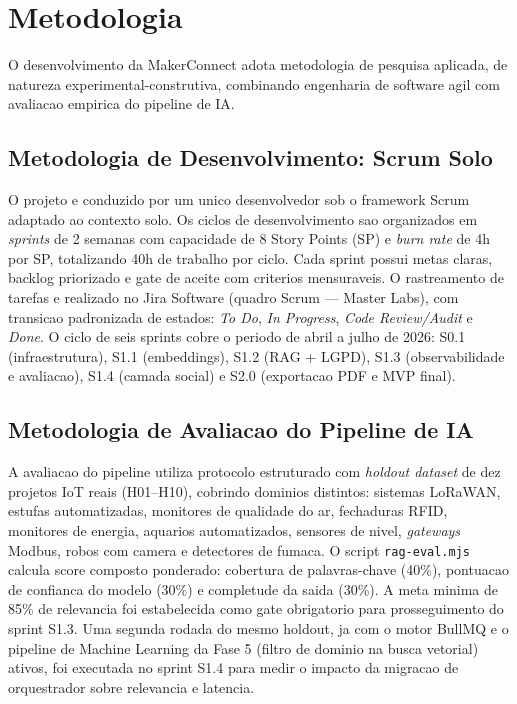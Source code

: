 \documentclass[portuguese]{sbcreviews-2025}%
\begin{document}
\section{Metodologia}

O desenvolvimento da MakerConnect adota metodologia de pesquisa aplicada, de natureza experimental-construtiva, combinando engenharia de software agil com avaliacao empirica do pipeline de IA.

\subsection{Metodologia de Desenvolvimento: Scrum Solo}

O projeto e conduzido por um unico desenvolvedor sob o framework Scrum adaptado ao contexto solo. Os ciclos de desenvolvimento sao organizados em \textit{sprints} de 2 semanas com capacidade de 8 Story Points (SP) e \textit{burn rate} de 4h por SP, totalizando 40h de trabalho por ciclo. Cada sprint possui metas claras, backlog priorizado e gate de aceite com criterios mensuraveis. O rastreamento de tarefas e realizado no Jira Software (quadro Scrum --- Master Labs), com transicao padronizada de estados: \textit{To Do}, \textit{In Progress}, \textit{Code Review/Audit} e \textit{Done}. O ciclo de seis sprints cobre o periodo de abril a julho de 2026: S0.1 (infraestrutura), S1.1 (embeddings), S1.2 (RAG + LGPD), S1.3 (observabilidade e avaliacao), S1.4 (camada social) e S2.0 (exportacao PDF e MVP final).

\subsection{Metodologia de Avaliacao do Pipeline de IA}

A avaliacao do pipeline utiliza protocolo estruturado com \textit{holdout dataset} de dez projetos IoT reais (H01--H10), cobrindo dominios distintos: sistemas LoRaWAN, estufas automatizadas, monitores de qualidade do ar, fechaduras RFID, monitores de energia, aquarios automatizados, sensores de nivel, \textit{gateways} Modbus, robos com camera e detectores de fumaca. O script \texttt{rag-eval.mjs} calcula score composto ponderado: cobertura de palavras-chave (40\%), pontuacao de confianca do modelo (30\%) e completude da saida (30\%). A meta minima de 85\% de relevancia foi estabelecida como gate obrigatorio para prosseguimento do sprint S1.3. Uma segunda rodada do mesmo holdout, ja com o motor BullMQ e o pipeline de Machine Learning da Fase 5 (filtro de dominio na busca vetorial) ativos, foi executada no sprint S1.4 para medir o impacto da migracao de orquestrador sobre relevancia e latencia.
\end{document}
